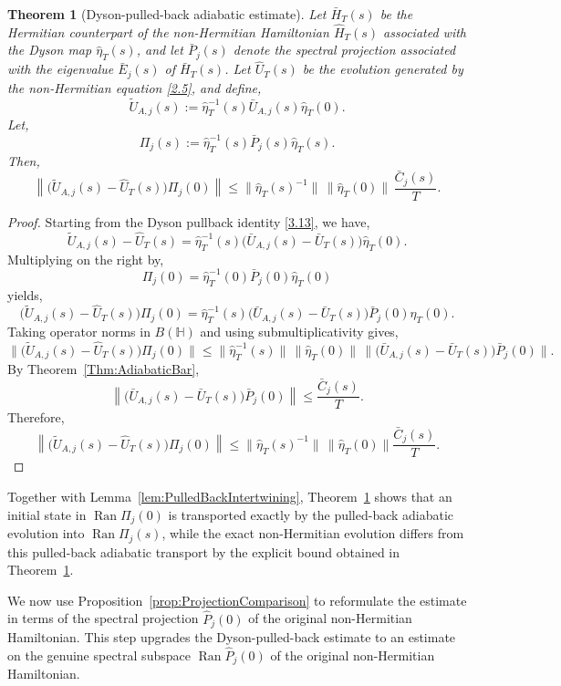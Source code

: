 \documentclass[pdflatex,sn-mathphys-num]{sn-jnl}
\theoremstyle{thmstyleone}
\newtheorem{theorem}{Theorem}
\theoremstyle{thmstyletwo}
\theoremstyle{thmstylethree}
\begin{document}
\begin{theorem}[Dyson-pulled-back adiabatic estimate]
\label{Thm:MainNonHermitian}
Let \(\bar H_T(s)\) be the Hermitian counterpart of the non-Hermitian Hamiltonian
\(\hat H_T(s)\) associated with the Dyson map \(\hat\eta_T(s)\), and let
\(\bar P_j(s)\) denote the spectral projection associated with the eigenvalue
\(\bar E_j(s)\) of \(\bar H_T(s)\). Let \(\hat U_T(s)\) be the evolution generated by
the non-Hermitian equation \eqref{2.5}, and define,
\[
\widetilde U_{A,j}(s)
:=
\hat\eta_T^{-1}(s)\bar U_{A,j}(s)\hat\eta_T(0).
\]
Let,
\[
\Pi_j(s):=\hat\eta_T^{-1}(s)\bar P_j(s)\hat\eta_T(s).
\]
Then,
\[
\left\|
\bigl(\widetilde U_{A,j}(s)-\hat U_T(s)\bigr)\Pi_j(0)
\right\|
\le
\|\hat\eta_T(s)^{-1}\|\,\|\hat\eta_T(0)\|\,
\frac{\bar C_j(s)}{T}.
\]
\end{theorem}

\begin{proof}
Starting from the Dyson pullback identity \eqref{3.13}, we have,
\[
 \widetilde U_{A,j}(s)-\hat U_T(s)
 =
 \hat\eta_T^{-1}(s)\big(\bar U_{A,j}(s)-\bar U_T(s)\big)\hat\eta_T(0).
\]
Multiplying on the right by,
\[
\Pi_j(0)=\hat\eta_T^{-1}(0)\bar P_j(0)\hat\eta_T(0)
\]
yields,
\[
 \big(\widetilde U_{A,j}(s)-\hat U_T(s)\big)\Pi_j(0)
 =
 \hat\eta_T^{-1}(s)
 \big(\bar U_{A,j}(s)-\bar U_T(s)\big)
 \bar P_j(0)\hat\eta_T(0).
\]
Taking operator norms in \(B(\mathbb{H})\) and using submultiplicativity gives,
\[
 \big\|
 \big(\widetilde U_{A,j}(s)-\hat U_T(s)\big)\Pi_j(0)
 \big\|
 \le
 \|\hat\eta_T^{-1}(s)\|\,\|\hat\eta_T(0)\|\,
 \big\|\big(\bar U_{A,j}(s)-\bar U_T(s)\big)\bar P_j(0)\big\|.
\]
By Theorem~\ref{Thm:AdiabaticBar},
\[
\left\|
\bigl(\bar U_{A,j}(s)-\bar U_T(s)\bigr)\bar P_j(0)
\right\|
\le
\frac{\bar C_j(s)}{T}.
\]
Therefore,
\[
\left\|
\bigl(\widetilde U_{A,j}(s)-\hat U_T(s)\bigr)\Pi_j(0)
\right\|
\le
\|\hat\eta_T(s)^{-1}\|\,\|\hat\eta_T(0)\|
\frac{\bar C_j(s)}{T}.
\]
\end{proof}

Together with Lemma~\ref{lem:PulledBackIntertwining},
Theorem~\ref{Thm:MainNonHermitian} shows that an initial state in
\(\operatorname{Ran}\Pi_j(0)\) is transported exactly by the pulled-back
adiabatic evolution into \(\operatorname{Ran}\Pi_j(s)\), while the exact
non-Hermitian evolution differs from this pulled-back adiabatic transport by the
explicit bound obtained in Theorem~\ref{Thm:MainNonHermitian}.

We now use Proposition~\ref{prop:ProjectionComparison} to reformulate the estimate in
terms of the spectral projection \(\hat P_j(0)\) of the original non-Hermitian Hamiltonian. This step upgrades the Dyson-pulled-back estimate to an estimate on the genuine spectral
subspace \(\operatorname{Ran}\hat P_j(0)\) of the original non-Hermitian Hamiltonian.
\end{document}
